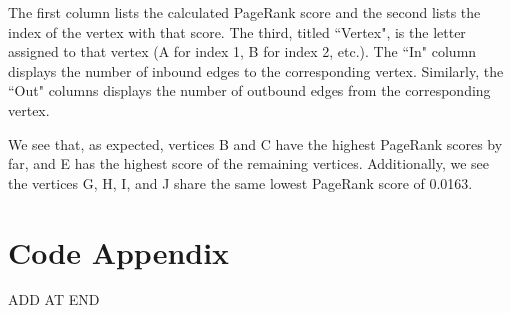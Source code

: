 \documentclass[12pt, titlepage, twoside]{amsart}
\begin{document}
The first column lists the calculated PageRank score and
the second lists the index of the vertex with that score.
The third, titled ``Vertex", is the letter assigned to that vertex (A for index 1, B for index 2, etc.).
The ``In" column displays the number of inbound edges to the corresponding vertex.
Similarly, the ``Out" columns displays the number of outbound edges from the corresponding vertex.

We see that, as expected, vertices B and C have the highest PageRank scores by far,
and E has the highest score of the remaining vertices.
Additionally, we see the vertices G, H, I, and J share the same lowest PageRank score of 0.0163.





\section{Code Appendix}

ADD AT END
\end{document}
